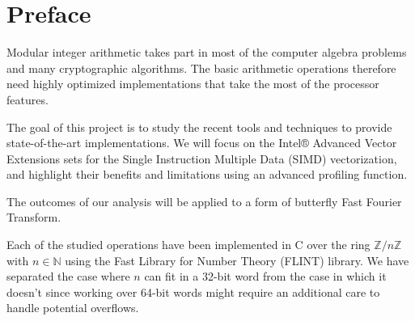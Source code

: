 \documentclass[a4paper]{article}
\begin{document}
%
%
\section{Preface}

Modular integer arithmetic takes part in most of the computer algebra problems and many
cryptographic algorithms. The basic arithmetic operations therefore need highly optimized implementations
that take the most of the processor features.

The goal of this project is to study the recent tools and techniques to provide state-of-the-art implementations.
We will focus on the Intel® Advanced Vector Extensions sets for the Single Instruction Multiple Data (SIMD) vectorization,
and highlight their benefits and limitations using an advanced profiling function.

The outcomes of our analysis will be applied to a form of butterfly Fast Fourier Transform.

\bigskip
Each of the studied operations have been implemented in C over the ring $\mathbb{Z}/n\mathbb{Z}$ with $n \in \mathbb{N}$
using the Fast Library for Number Theory (FLINT) library.
We have separated the case where $n$ can fit in a 32-bit word from the case in which it doesn't 
since working over 64-bit words might require an additional care to handle potential overflows.
\end{document}
